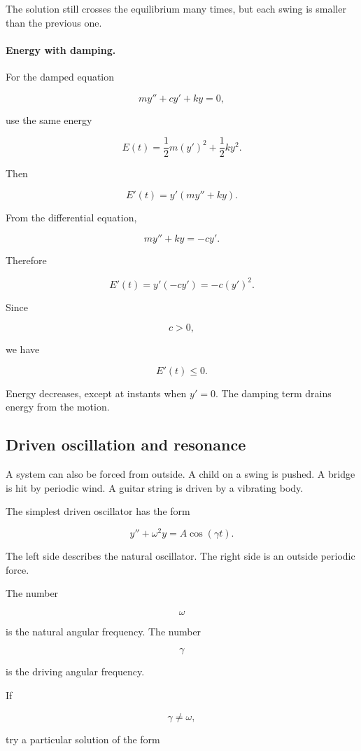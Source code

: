 The solution still crosses the equilibrium many times, but each swing is smaller than the
previous one.

\paragraph{Energy with damping.}
For the damped equation

\[
my''+cy'+ky=0,
\]

use the same energy

\[
E(t)=\frac12m(y')^2+\frac12ky^2.
\]

Then

\[
E'(t)=y'(my''+ky).
\]

From the differential equation,

\[
my''+ky=-cy'.
\]

Therefore

\[
E'(t)=y'(-cy')=-c(y')^2.
\]

Since

\[
c>0,
\]

we have

\[
\boxed{
E'(t)\le0.
}
\]

Energy decreases, except at instants when \(y'=0\).  The damping term drains energy
from the motion.

\subsection{Driven oscillation and resonance}
\label{subsec:driven-oscillation-resonance}

A system can also be forced from outside.  A child on a swing is pushed.  A bridge is hit
by periodic wind.  A guitar string is driven by a vibrating body.

The simplest driven oscillator has the form

\[
\boxed{
y''+\omega^2y=A\cos(\gamma t).
}
\]

The left side describes the natural oscillator.  The right side is an outside periodic force.

The number

\[
\omega
\]

is the natural angular frequency.  The number

\[
\gamma
\]

is the driving angular frequency.

If

\[
\gamma\neq\omega,
\]

try a particular solution of the form

